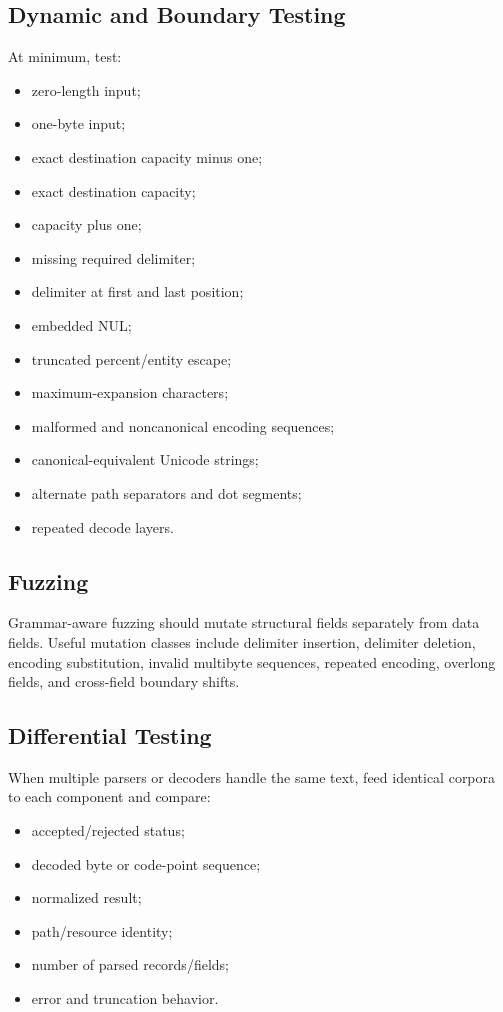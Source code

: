 \documentclass[11pt]{article}
\begin{document}
\subsection{Dynamic and Boundary Testing}

At minimum, test:

\begin{itemize}
  \item zero-length input;
  \item one-byte input;
  \item exact destination capacity minus one;
  \item exact destination capacity;
  \item capacity plus one;
  \item missing required delimiter;
  \item delimiter at first and last position;
  \item embedded NUL;
  \item truncated percent/entity escape;
  \item maximum-expansion characters;
  \item malformed and noncanonical encoding sequences;
  \item canonical-equivalent Unicode strings;
  \item alternate path separators and dot segments;
  \item repeated decode layers.
\end{itemize}

\subsection{Fuzzing}

Grammar-aware fuzzing should mutate structural fields separately from data fields. Useful mutation classes include delimiter insertion, delimiter deletion, encoding substitution, invalid multibyte sequences, repeated encoding, overlong fields, and cross-field boundary shifts.

\subsection{Differential Testing}

When multiple parsers or decoders handle the same text, feed identical corpora to each component and compare:

\begin{itemize}
  \item accepted/rejected status;
  \item decoded byte or code-point sequence;
  \item normalized result;
  \item path/resource identity;
  \item number of parsed records/fields;
  \item error and truncation behavior.
\end{itemize}
\end{document}
